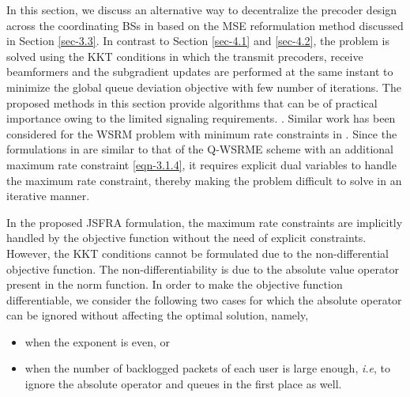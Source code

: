 
In this section, we discuss an alternative way to decentralize the precoder design across the coordinating \acp{BS} in  based on the \ac{MSE} reformulation method discussed in Section \ref{sec-3.3}. In contrast to Section \ref{sec-4.1} and \ref{sec-4.2}, the problem is solved using the \ac{KKT} conditions in which the transmit precoders, receive beamformers and the subgradient updates are performed at the same instant to minimize the global queue deviation objective with few number of iterations. The proposed methods in this section provide algorithms that can be of practical importance owing to the limited signaling requirements. . Similar work has been considered for the \ac{WSRM} problem with minimum rate constraints in \cite{kaleva2013decentralized,kaleva2013primal}. Since the formulations in \cite{kaleva2013decentralized,kaleva2013primal} are similar to that of the \ac{Q-WSRME} scheme with an additional maximum rate constraint \eqref{eqn-3.1.4}, it requires explicit dual variables to handle the maximum rate constraint, thereby making the problem difficult to solve in an iterative manner.

In the proposed \ac{JSFRA} formulation, the maximum rate constraints are implicitly handled by the objective function without the need of explicit constraints. However, the \ac{KKT} conditions cannot be formulated due to the non-differential objective function. The non-differentiability is due to the absolute value operator present in the norm function. In order to make the objective function differentiable, we consider the following two cases for which the absolute operator can be ignored without affecting the optimal solution, namely,
\begin{itemize}
\item when the exponent  is even, or
\item when the number of backlogged packets of each user is large enough, \textit{i.e},  to ignore the absolute operator and queues in the first place as well.
\end{itemize}

